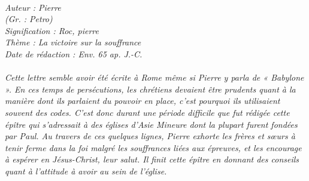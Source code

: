 \BFont
\noindent\hrulefill
{\footnotesize
\textit{
\bigskip
{\centering{}
\\Auteur : Pierre
\\(Gr. : Petro)
\\Signification : Roc, pierre
\\Thème : La victoire sur la souffrance
\\Date de rédaction : Env. 65 ap. J.-C.\\}
}
\textit{
\\Cette lettre semble avoir été écrite à Rome même si Pierre y parla de « Babylone ». En ces temps de persécutions, les chrétiens devaient être prudents quant à la manière dont ils parlaient du pouvoir en place, c'est pourquoi ils utilisaient souvent des codes. C'est donc durant une période difficile que fut rédigée cette épître qui s'adressait à des églises d'Asie Mineure dont la plupart furent fondées par Paul. Au travers de ces quelques lignes, Pierre exhorte les frères et sœurs à tenir ferme dans la foi malgré les souffrances liées aux épreuves, et les encourage à espérer en Jésus-Christ, leur salut. Il finit cette épître en donnant des conseils quant à l'attitude à avoir au sein de l'église.\bigskip
}
}
\par\nobreak\noindent\hrulefill
